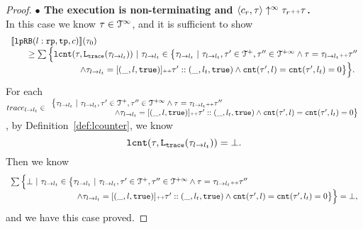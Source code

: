 \begin{proof}
\textbf{$\bullet$ The execution is non-terminating and {$\langle {c_r}, \mathtt{\tau} \rangle \uparrow^{\infty} \mathtt{\tau}_r {\scriptscriptstyle ++} \mathtt{\tau}$}.} 
\\
 In this case we know $\mathtt{\tau} \in \mathcal{T}^{\infty}$, and it is sufficient to show
\\
\[
  \begin{array}{l}
    \llbracket \mathtt{lpRB}(l: \mathtt{rp}, \mathtt{tp}, c) \rrbracket(\mathtt{\tau}_0) 
    \\ \qquad \geq 
      \sum\Big\{
      \mathtt{lcnt}(\mathtt{\tau}, \mathtt{L}_{\mathtt{{trace}}}(\mathtt{\tau}_{l \to l_t})) ~\vert~ \mathtt{\tau}_{l \to l_t} \in 
      \big\{\mathtt{\tau}_{l \to l_t} ~\vert~ 
      \mathtt{\tau}_{l \to l_t}, \mathtt{\tau}' \in \mathcal{T}^{+}, \mathtt{\tau}'' \in \mathcal{T}^{+\infty}
      \land \mathtt{\tau} = \mathtt{\tau}_{l \to l_t} {\scriptscriptstyle ++} \mathtt{\tau}''
      \\ \qquad \qquad \qquad \qquad
      \land \mathtt{\tau}_{l \to l_t} = [(\_, l, \mathtt{true})] {\scriptscriptstyle ++} \mathtt{\tau}' :: (\_, l_t, \mathtt{true})
      \land \mathtt{cnt}(\mathtt{\tau}', l) = \mathtt{cnt}(\mathtt{\tau}', l_t) = 0 
      \big\}
      \Big\}.
  \end{array}
\]
For each 
$ trace_{l \to l_t} \in
\begin{array}{l}
    \big\{\mathtt{\tau}_{l \to l_t} ~\vert~ 
    \mathtt{\tau}_{l \to l_t}, \mathtt{\tau}' \in \mathcal{T}^{+}, \mathtt{\tau}'' \in \mathcal{T}^{+\infty}
    \land \mathtt{\tau} = \mathtt{\tau}_{l \to l_t} {\scriptscriptstyle ++} \mathtt{\tau}''
    \\ \qquad \qquad \qquad \qquad
    \land \mathtt{\tau}_{l \to l_t} = [(\_, l, \mathtt{true})] {\scriptscriptstyle ++} \mathtt{\tau}' :: (\_, l_t, \mathtt{true})
    \land \mathtt{cnt}(\mathtt{\tau}', l) = \mathtt{cnt}(\mathtt{\tau}', l_t) = 0 
    \big\}
\end{array}
$, by Definition~\ref{def:lcounter}, we know 
\[
  \mathtt{lcnt}(\mathtt{\tau}, \mathtt{L}_{\mathtt{{trace}}}(\mathtt{\tau}_{l \to l_t})) = \bot.
\]
Then we know
\[
  \begin{array}{l}
      \sum\Big\{ \bot ~\vert~ \mathtt{\tau}_{l \to l_t} \in 
      \big\{\mathtt{\tau}_{l \to l_t} ~\vert~ 
      \mathtt{\tau}_{l \to l_t}, \mathtt{\tau}' \in \mathcal{T}^{+}, \mathtt{\tau}'' \in \mathcal{T}^{+\infty}
      \land \mathtt{\tau} = \mathtt{\tau}_{l \to l_t} {\scriptscriptstyle ++} \mathtt{\tau}''
      \\ \qquad \qquad \qquad \qquad
      \land \mathtt{\tau}_{l \to l_t} = [(\_, l, \mathtt{true})] {\scriptscriptstyle ++} \mathtt{\tau}' :: (\_, l_t, \mathtt{true})
      \land \mathtt{cnt}(\mathtt{\tau}', l) = \mathtt{cnt}(\mathtt{\tau}', l_t) = 0 
      \big\}
      \Big\} = \bot,
  \end{array}
  \]
and we have this case proved.
\end{proof}